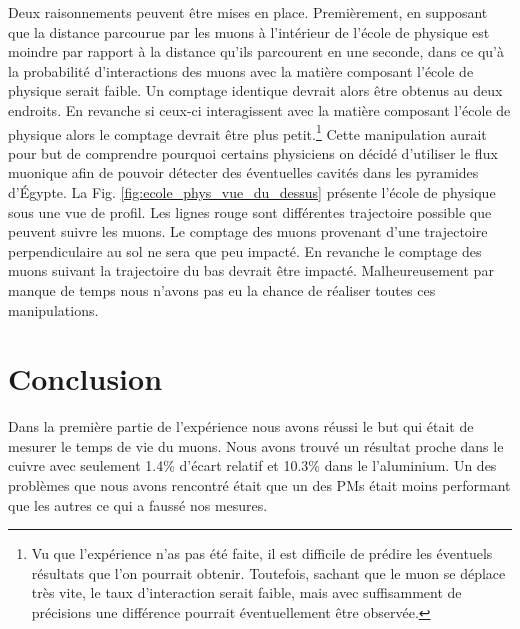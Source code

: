 \documentclass[12pt]{article}
\begin{document}
Deux raisonnements peuvent être mises en place.
Premièrement, en supposant que la distance parcourue par les muons à l'intérieur de l'école de physique est moindre par rapport à la distance qu'ils parcourent en une seconde, dans ce qu'à la probabilité d'interactions des muons avec la matière composant l'école de physique serait faible. Un comptage identique devrait alors être obtenus au deux endroits.
En revanche si ceux-ci interagissent avec la matière composant l'école de physique alors le comptage devrait être plus petit.\footnote{Vu que l'expérience n'as pas été faite, il est difficile de prédire les éventuels résultats que l'on pourrait obtenir. Toutefois, sachant que le muon se déplace très vite, le taux d'interaction serait faible, mais avec suffisamment de précisions une différence pourrait éventuellement 
être observée.} Cette manipulation aurait pour but de comprendre pourquoi certains physiciens on décidé d'utiliser le flux muonique afin de pouvoir détecter des éventuelles cavités dans les pyramides d'Égypte. La Fig. \ref{fig:ecole_phys_vue_du_dessus} présente l'école de physique sous une vue de profil. Les lignes rouge sont différentes trajectoire possible que peuvent suivre les muons. Le comptage des muons provenant d'une trajectoire perpendiculaire au sol ne sera que peu impacté. En revanche le comptage des muons suivant la trajectoire du bas devrait être impacté. Malheureusement par manque de temps nous n'avons pas eu la chance de réaliser toutes ces manipulations.



\section{Conclusion}

Dans la première partie de l'expérience nous avons réussi le but qui était de mesurer le temps de vie du muons. Nous avons trouvé un résultat proche dans le cuivre avec seulement 1.4\% d'écart relatif et 10.3\% dans le l'aluminium. Un des problèmes que nous avons rencontré était que un des PMs était moins performant que les autres ce qui a faussé nos mesures.
\end{document}
